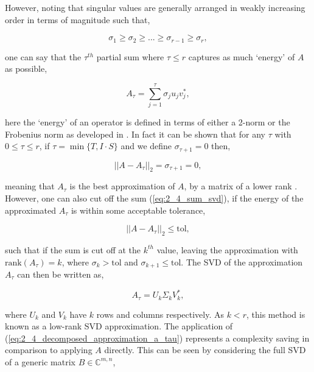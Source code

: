 However, noting that singular values are generally arranged in weakly increasing
order in terms of magnitude such that,

\begin{equation}
    \sigma_1 \geq \sigma_2 \geq ... \geq \sigma_{r-1} \geq \sigma_r,
\end{equation}

one can say that the $\tau^{th}$ partial sum where
$\tau \leq r$ captures as much `energy' of $A$ as possible,

\begin{equation}
    A_\tau = \sum_{j=1}^{\tau}\sigma_j u_j v_j^*,
    \label{eq:2_4_sum_svd}
\end{equation}

here the `energy' of an operator is defined in terms of either a 2-norm or the
Frobenius norm as developed in \cite{Trefethen:1997:SIAM}. In fact it can be shown
that for any $\tau$ with $0 \leq \tau \leq r$, if $\tau = \min \{T, I \cdot S\}$
and we define $\sigma_{\tau + 1} = 0$ then,

\begin{equation}
    ||A - A_\tau ||_2 = \sigma_{\tau+1} = 0,
\end{equation}

meaning that $A_\tau$ is the best approximation of $A$, by a matrix of a lower rank
\cite{Trefethen:1997:SIAM}. However, one can also cut off the sum (\ref{eq:2_4_sum_svd}),
if the energy of the approximated $A_\tau$ is within some acceptable tolerance,

\begin{equation}
    ||A - A_\tau ||_2  \leq  \text{tol},
    \label{eq:2_4_svd_tol}
\end{equation}

such that if the sum is cut off at the $k^{th}$ value, leaving the approximation with
$\text{rank}(A_\tau) = k$, where $\sigma_k > \text{tol}$ and
$\sigma_{k+1} \leq \text{tol}$. The \gls{SVD} of the approximation $A_\tau$ can
then be written as,

\begin{equation}
    A_\tau = U_k \Sigma_k V_k^*,
    \label{eq:2_4_decomposed_approximation_a_tau}
\end{equation}

where $U_k$ and $V_k$ have $k$ rows and columns respectively. As $k < r$, this
method is known as a low-rank SVD approximation. The application of
(\ref{eq:2_4_decomposed_approximation_a_tau}) represents a complexity saving in
comparison to applying $A$ directly. This can be seen by considering the full
SVD of a generic matrix $B \in \mathbb{C}^{m, n}$,

